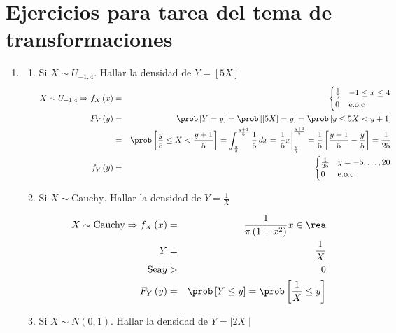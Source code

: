 \section{Ejercicios para tarea del tema de transformaciones}



\begin{enumerate}
\item 
\begin{enumerate}
\item Si $X \sim U_{-1,4}$. Hallar la densidad de $Y= \left[5X \right]$
 \begin{eqnarray*}
 X \sim U_{-1,4} \Rightarrow f_{X}\left(x \right)&=& \begin{cases} \frac{1}{5} & -1 \leq x \leq 4\\
 0 & \textrm{e.o.c}
 \end{cases}\\
 F_{Y} \left( y \right) &=& \prob \left[Y=y \right]= \prob \left[\left[5X \right]= y \right] = \prob \left[ y \leq 5X < y+1 \right]\\
 &=& \prob \left[\frac{y}{5}\leq X < \frac{y+1}{5} \right] = \int_{\frac{y}{5}}^{\frac{y+1}{5}} \frac{1}{5} \, dx = \left. \frac{1}{5}x \right|_{\frac{y}{5}}^{\frac{y+1}{5}} = \frac{1}{5} \left[ \frac{y+1}{5}- \frac{y}{5} \right]= \frac{1}{25}\\
 f_{Y}\left(y \right)&=&    \begin{cases} \frac{1}{25} & y= -5 , \ldots, 20\\
 0 & \textrm{e.o.c}
 \end{cases}
\end{eqnarray*}

\item Si $X \sim \textrm{Cauchy}$. Hallar la densidad de $Y= \frac{1}{X}$

\begin{eqnarray*}
 X \sim \textrm{Cauchy} \Rightarrow f_{X}\left(x \right)&=& \frac{1}{\pi \left(1+x^2 \right)} x \in \rea\\
 Y&=& \frac{1}{X}\\
  \textrm{Sea} y&>&0\\
  F_{Y} \left(y \right)&=& \prob \left[Y \leq y \right] = \prob \left[ \frac{1}{X} \leq y \right] 
\end{eqnarray*}
\item Si $X \sim N \left(0,1 \right) $. Hallar la densidad de $Y= \mid2X\mid $


\end{enumerate}
\end{enumerate}
